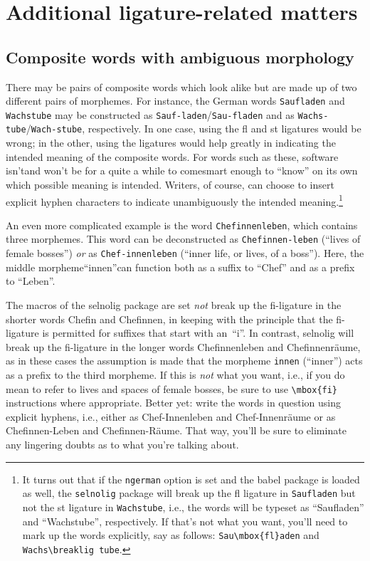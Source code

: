 \documentclass[11pt]{article}
\newcommand{\pkg}[1]{\textsf{#1}}
\newcommand{\opt}[1]{\texttt{#1}}
\begin{document}
\section{Additional ligature-related matters}
\label{sec:options}


\subsection{Composite words with ambiguous morphology}

There may be pairs of composite words which look alike but are made up of two different pairs of morphemes. For instance, the German words \opt{Saufladen} and \opt{Wachstube} may be constructed as \opt{Sauf-laden}\slash \opt{Sau-fladen} and as \opt{Wachs-tube}\slash \opt{Wach-stube}, respectively. In one case, using the fl and st ligatures would be wrong; in the other, using the ligatures would help greatly in indicating the intended meaning of the composite words. 
For words such as these, software isn't\textemdash and won't be for a quite a while to come\textemdash smart enough to \enquote{know} on its own which possible meaning is intended. Writers, of course, can choose to insert explicit hyphen characters to indicate unambiguously the intended meaning.\footnote{It turns out that if the \opt{ngerman} option is set and the \pkg{babel} package is loaded as well, the \opt{selnolig} package will break up the fl ligature in \opt{Saufladen} but not the st ligature in \opt{Wachstube}, i.e., the words will be typeset as \enquote{Saufladen} and \enquote{Wachstube}, respectively. If that's not what you want, you'll need to mark up the words explicitly, say as follows: \Verb+Sau\mbox{fl}aden+ and \Verb+Wachs\breaklig tube+. }

An even more complicated example is the word \opt{Chefinnenleben}, which contains three morphemes. This word can be deconstructed as \opt{Chefinnen-leben} (\enquote{lives of female bosses}) \emph{or} as \opt{Chef-innenleben} (\enquote{inner life, or lives, of a boss}). Here, the middle morpheme\textemdash\enquote{innen}\textemdash can function both as a suffix to \enquote{Chef} and as a prefix to \enquote{Leben}. 

The macros of the \pkg{selnolig} package are set \emph{not} break up the fi-ligature in the shorter words Chefin and Chefinnen, in keeping with the principle that the fi-ligature is permitted for suffixes that start with an~\enquote{i}. In contrast, \pkg{selnolig} will break up the fi-ligature in the longer words Chefinnenleben and Chefinnenräume, as in these cases the assumption is made that the morpheme \opt{innen} (\enquote{inner}) acts as a prefix to the third morpheme. If this is \emph{not} what you want, i.e., if you do mean to refer to lives and spaces of female bosses, be sure to use \Verb+\mbox{fi}+ instructions where appropriate. Better yet: write the words in question using explicit hyphens, i.e., either as Chef-Innenleben and Chef-Innenräume or as Chefinnen-Leben and Chefinnen-Räume. That way, you'll be sure to eliminate any lingering doubts as to what you're talking about.
\end{document}
